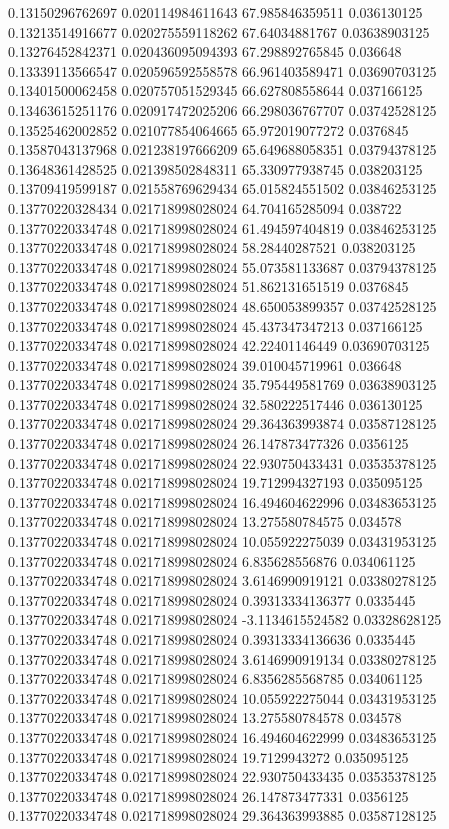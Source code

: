 0.13150296762697 0.020114984611643 67.985846359511 0.036130125
0.13213514916677 0.020275559118262 67.64034881767 0.03638903125
0.13276452842371 0.020436095094393 67.298892765845 0.036648
0.13339113566547 0.020596592558578 66.961403589471 0.03690703125
0.13401500062458 0.020757051529345 66.627808558644 0.037166125
0.13463615251176 0.020917472025206 66.298036767707 0.03742528125
0.13525462002852 0.021077854064665 65.972019077272 0.0376845
0.13587043137968 0.021238197666209 65.649688058351 0.03794378125
0.13648361428525 0.021398502848311 65.330977938745 0.038203125
0.13709419599187 0.021558769629434 65.015824551502 0.03846253125
0.13770220328434 0.021718998028024 64.704165285094 0.038722
0.13770220334748 0.021718998028024 61.494597404819 0.03846253125
0.13770220334748 0.021718998028024 58.28440287521 0.038203125
0.13770220334748 0.021718998028024 55.073581133687 0.03794378125
0.13770220334748 0.021718998028024 51.862131651519 0.0376845
0.13770220334748 0.021718998028024 48.650053899357 0.03742528125
0.13770220334748 0.021718998028024 45.437347347213 0.037166125
0.13770220334748 0.021718998028024 42.22401146449 0.03690703125
0.13770220334748 0.021718998028024 39.010045719961 0.036648
0.13770220334748 0.021718998028024 35.795449581769 0.03638903125
0.13770220334748 0.021718998028024 32.580222517446 0.036130125
0.13770220334748 0.021718998028024 29.364363993874 0.03587128125
0.13770220334748 0.021718998028024 26.147873477326 0.0356125
0.13770220334748 0.021718998028024 22.930750433431 0.03535378125
0.13770220334748 0.021718998028024 19.712994327193 0.035095125
0.13770220334748 0.021718998028024 16.494604622996 0.03483653125
0.13770220334748 0.021718998028024 13.275580784575 0.034578
0.13770220334748 0.021718998028024 10.055922275039 0.03431953125
0.13770220334748 0.021718998028024 6.835628556876 0.034061125
0.13770220334748 0.021718998028024 3.6146990919121 0.03380278125
0.13770220334748 0.021718998028024 0.39313334136377 0.0335445
0.13770220334748 0.021718998028024 -3.1134615524582 0.03328628125
0.13770220334748 0.021718998028024 0.39313334136636 0.0335445
0.13770220334748 0.021718998028024 3.6146990919134 0.03380278125
0.13770220334748 0.021718998028024 6.8356285568785 0.034061125
0.13770220334748 0.021718998028024 10.055922275044 0.03431953125
0.13770220334748 0.021718998028024 13.275580784578 0.034578
0.13770220334748 0.021718998028024 16.494604622999 0.03483653125
0.13770220334748 0.021718998028024 19.7129943272 0.035095125
0.13770220334748 0.021718998028024 22.930750433435 0.03535378125
0.13770220334748 0.021718998028024 26.147873477331 0.0356125
0.13770220334748 0.021718998028024 29.364363993885 0.03587128125
